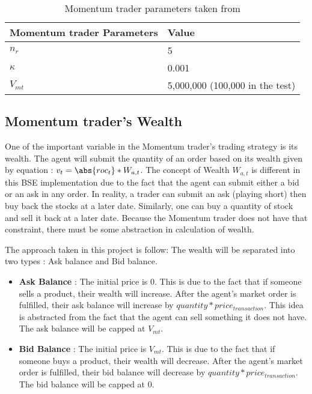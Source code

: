 \begin{table}[h]
\centering
\begin{tabular}{ |m||p{4cm}|} 
\hline
\textbf{Momentum trader Parameters}& \textbf{Value} \\
\hline
\hline
$n_r$ & 5 \\ 
\hline
$\kappa$ & 0.001\\ 
\hline
$V_{mt}$ & 5,000,000 (100,000 in the test) \\ 
\hline
\end{tabular}
\caption{Momentum trader parameters taken from \cite{McGroarty}} 
\end{table}
\FloatBarrier 

\subsection{Momentum trader's Wealth}
One of the important variable in the Momentum trader's trading strategy is its wealth. The agent will submit the quantity of an order based on its wealth given by equation : $v_t = \abs{roc_t} * W_{a,t}$. The concept of Wealth $W_{a,t}$ is different in this BSE implementation due to the fact that the agent can submit either a bid or an ask in any order. In reality, a trader can submit an ask (playing short) then buy back the stocks at a later date. Similarly, one can buy a quantity of stock and sell it back at a later date. Because the Momentum trader does not have that constraint, there must be some abstraction in calculation of wealth. 

The approach taken in this project is follow: The wealth will be separated into two types : Ask balance and Bid balance. 

\begin{itemize}
  \item \textbf{Ask Balance} : The initial price is 0. This is due to the fact that if someone sells a product, their wealth will increase. After the agent's market order is fulfilled, their ask balance will increase by $quantity * price_{transaction}$. This idea is abstracted from the fact that the agent can sell something it does not have. The ask balance will be capped at $V_{mt}$. 
  \item \textbf{Bid Balance} : The initial price is $V_{mt}$. This is due to the fact that if someone buys a product, their wealth will decrease. After the agent's market order is fulfilled, their bid balance will decrease by $quantity * price_{transaction}$. The bid balance will be capped at 0.
\end{itemize}

